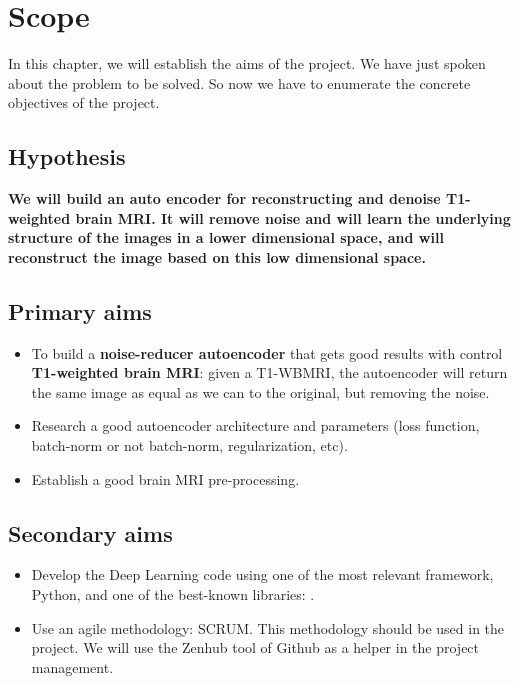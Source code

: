 \chapter{Scope}
\label{chapter:scope}

In this chapter, we will establish the aims of the project. We have just spoken about the problem to be solved. So now we have to enumerate the concrete objectives of the project. 



\section{Hypothesis}

\textbf{We will build an auto encoder for reconstructing and denoise T1-weighted brain MRI. It will remove noise and will learn the underlying structure of the images in a lower dimensional space, and will reconstruct the image based on this low dimensional space.}

\section{Primary aims}

\begin{itemize}
    \item To build a \textbf{noise-reducer autoencoder} that gets good results with control \textbf{T1-weighted brain MRI}: given a T1-WBMRI, the autoencoder will return the same image as equal as we can to the original, but removing the noise.
    \item Research a good autoencoder architecture and parameters (loss function, batch-norm or not batch-norm, regularization, etc).
    \item Establish a good brain MRI pre-processing.
\end{itemize}

\section{Secondary aims}

\begin{itemize}
    \item Develop the Deep Learning code using one of the most relevant framework, Python, and one of the best-known libraries:  .
    \item Use an agile methodology: SCRUM. This methodology should be used in the project. We will use the Zenhub tool of Github as a helper in the project management.
\end{itemize}

